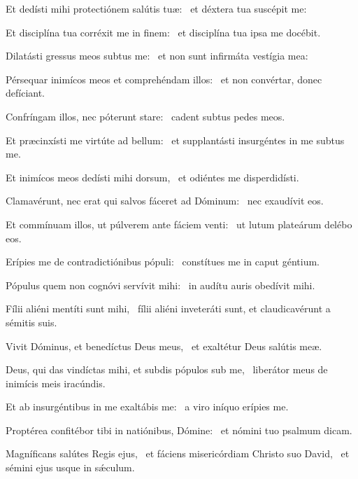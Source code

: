 
\item Et dedísti mihi protectiónem salútis tuæ:~\psstar{} et déxtera tua suscépit me:

\item Et disciplína tua corréxit me in finem:~\psstar{} et disciplína tua ipsa me docébit.

\item Dilatásti gressus meos subtus me:~\psstar{} et non sunt infirmáta vestígia mea:

\item Pérsequar inimícos meos et comprehéndam illos:~\psstar{} et non convértar, donec defíciant.

\item Confríngam illos, nec póterunt stare:~\psstar{} cadent subtus pedes meos.

\item Et præcinxísti me virtúte ad bellum:~\psstar{} et supplantásti insurgéntes in me subtus me.

\item Et inimícos meos dedísti mihi dorsum,~\psstar{} et odiéntes me disperdidísti.

\item Clamavérunt, nec erat qui salvos fáceret ad Dóminum:~\psstar{} nec exaudívit eos.

\item Et commínuam illos, ut púlverem ante fáciem venti:~\psstar{} ut lutum plateárum delébo eos.

\item Erípies me de contradictiónibus pópuli:~\psstar{} constítues me in caput géntium.

\item Pópulus quem non cognóvi servívit mihi:~\psstar{} in audítu auris obedívit mihi.

\item Fílii aliéni mentíti sunt mihi,~\psstar{} fílii aliéni inveteráti sunt, et claudicavérunt a sémitis suis.

\item Vivit Dóminus, et benedíctus Deus meus,~\psstar{} et exaltétur Deus salútis meæ.

\item Deus, qui das vindíctas mihi, et subdis pópulos sub me,~\psstar{} liberátor meus de inimícis meis iracúndis.

\item Et ab insurgéntibus in me exaltábis me:~\psstar{} a viro iníquo erípies me.

\item Proptérea confitébor tibi in natiónibus, Dómine:~\psstar{} et nómini tuo psalmum dicam.

\item Magníficans salútes Regis ejus,~\pscross{} et fáciens misericórdiam Christo suo David,~\psstar{} et sémini ejus usque in sǽculum.